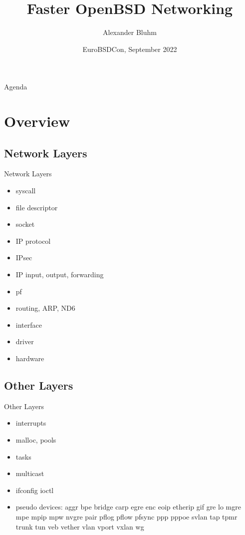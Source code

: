 \documentclass[14pt,aspectratio=169]{beamer}
\author{Alexander Bluhm}
\title{Faster OpenBSD Networking}
\institute{bluhm@openbsd.org}
\date{EuroBSDCon, September 2022}
\begin{document}
\begin{frame}
\titlepage
\end{frame}

\begin{frame}{Agenda}
\setcounter{tocdepth}{1}
\tableofcontents
\end{frame}

\section{Overview}

\subsection{Network Layers}
\begin{frame}{Network Layers}
\begin{itemize}
\item syscall
\item file descriptor
\item socket
\item IP protocol
\item IPsec
\item IP input, output, forwarding
\item pf
\item routing, ARP, ND6
\item interface
\item driver
\item hardware
\end{itemize}
\end{frame}

\subsection{Other Layers}
\begin{frame}{Other Layers}
\begin{itemize}
\item interrupts
\item malloc, pools
\item tasks
\item multicast
\item ifconfig ioctl
\item pseudo devices:
    aggr bpe bridge carp egre enc eoip etherip gif gre lo mgre mpe
    mpip mpw nvgre pair pflog pflow pfsync ppp pppoe svlan tap tpmr
    trunk tun veb vether vlan vport vxlan wg
\end{itemize}
\end{frame}
\end{document}

